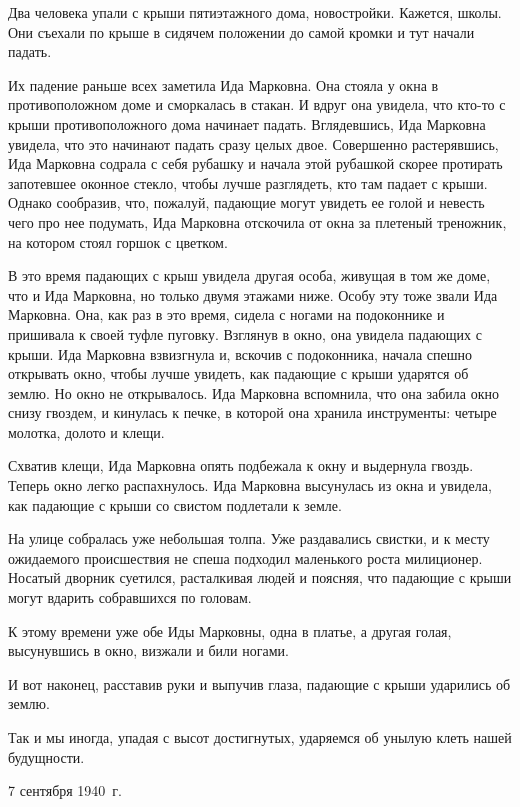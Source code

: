 Два человека упали с крыши пятиэтажного дома, новостройки. Кажется, школы. Они съехали по крыше в сидячем положении до самой кромки и тут начали падать.

Их падение раньше всех заметила Ида Марковна. Она стояла у окна в противоположном доме и сморкалась в стакан. И вдруг она увидела, что кто-то с крыши противоположного дома начинает падать. Вглядевшись, Ида Марковна увидела, что это начинают падать сразу целых двое. Совершенно растерявшись, Ида Марковна содрала с себя рубашку и начала этой рубашкой скорее протирать запотевшее оконное стекло, чтобы лучше разглядеть, кто там падает с крыши. Однако сообразив, что, пожалуй, падающие могут увидеть ее голой и невесть чего про нее подумать, Ида Марковна отскочила от окна за плетеный треножник, на котором стоял горшок с цветком.

В это время падающих с крыш увидела другая особа, живущая в том же доме, что и Ида Марковна, но только двумя этажами ниже. Особу эту тоже звали Ида Марковна. Она, как раз в это время, сидела с ногами на подоконнике и пришивала к своей туфле пуговку. Взглянув в окно, она увидела падающих с крыши. Ида Марковна взвизгнула и, вскочив с подоконника, начала спешно открывать окно, чтобы лучше увидеть, как падающие с крыши ударятся об землю. Но окно не открывалось. Ида Марковна вспомнила, что она забила окно снизу гвоздем, и кинулась к печке, в которой она хранила инструменты: четыре молотка, долото и клещи.

Схватив клещи, Ида Марковна опять подбежала к окну и выдернула гвоздь. Теперь окно легко распахнулось. Ида Марковна высунулась из окна и увидела, как падающие с крыши со свистом подлетали к земле.

На улице собралась уже небольшая толпа. Уже раздавались свистки, и к месту ожидаемого происшествия не спеша подходил маленького роста милиционер. Носатый дворник суетился, расталкивая людей и поясняя, что падающие с крыши могут вдарить собравшихся по головам.

К этому времени уже обе Иды Марковны, одна в платье, а другая голая, высунувшись в окно, визжали и били ногами.

И вот наконец, расставив руки и выпучив глаза, падающие с крыши ударились об землю.

Так и мы иногда, упадая с высот достигнутых, ударяемся об унылую клеть нашей будущности.

\begin{flushright}
7 сентября 1940~г.
\end{flushright}